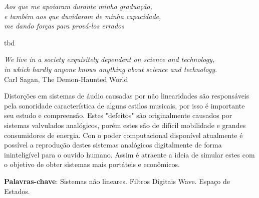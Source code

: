 
\begin{dedicatoria}
	\vspace*{\fill}
	\centering
	\noindent
	\textit{Aos que me apoiaram durante minha graduação, \\e também aos que duvidaram de minha capacidade, \\me dando forças para prová-los errados} \vspace*{\fill}
\end{dedicatoria}


\begin{agradecimentos}
tbd
\end{agradecimentos}


\begin{epigrafe}
	\vspace*{\fill}
	\begin{flushright} 
		\textit{We live in a society exquisitely dependent on science and technology,\\ in which hardly anyone knows anything about science and technology.}\\ \vspace{\onelineskip}
		Carl Sagan, The Demon-Haunted World
	\end{flushright}
\end{epigrafe}


\setlength{\absparsep}{18pt} %
\begin{resumo}
	Distorções em sistemas de áudio causadas por não linearidades são responsáveis pela sonoridade característica de alguns estilos musicais, por isso é importante seu estudo e compreensão. Estes "defeitos" são originalmente causados por sistemas valvulados analógicos, porém estes são de difícil mobilidade e grandes consumidores de energia. Con o poder computacional disponível atualmente é possível a reprodução destes sistemas analógicos digitalmente de forma ininteligível para o ouvido humano. Assim é atraente a ideia de simular estes com o objetivo de obter sistemas mais portáteis e econômicos.

	\vspace{\onelineskip}
	\textbf{Palavras-chave}: Sistemas não lineares. Filtros Digitais Wave. Espaço de Estados.
\end{resumo}

